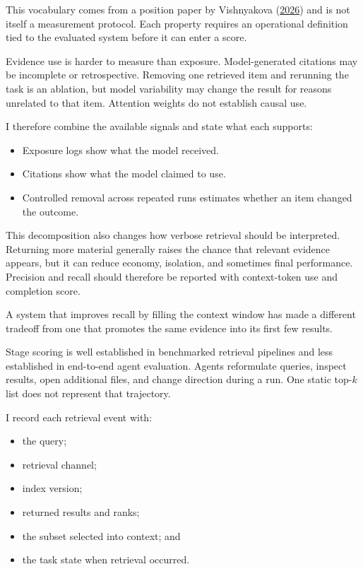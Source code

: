This vocabulary comes from a position paper by Vishnyakova (\href{https://arxiv.org/abs/2603.09619}{2026}) and is not itself a measurement protocol. Each property requires an operational definition tied to the evaluated system before it can enter a score.

Evidence use is harder to measure than exposure. Model-generated citations may be incomplete or retrospective. Removing one retrieved item and rerunning the task is an ablation, but model variability may change the result for reasons unrelated to that item. Attention weights do not establish causal use.


I therefore combine the available signals and state what each supports:

\begin{itemize}
\tightlist
\item
  Exposure logs show what the model received.
\item
  Citations show what the model claimed to use.
\item
  Controlled removal across repeated runs estimates whether an item changed the outcome.
\end{itemize}

This decomposition also changes how verbose retrieval should be interpreted. Returning more material generally raises the chance that relevant evidence appears, but it can reduce economy, isolation, and sometimes final performance. Precision and recall should therefore be reported with context-token use and completion score.

A system that improves recall by filling the context window has made a different tradeoff from one that promotes the same evidence into its first few results.

Stage scoring is well established in benchmarked retrieval pipelines and less established in end-to-end agent evaluation. Agents reformulate queries, inspect results, open additional files, and change direction during a run. One static top-\(k\) list does not represent that trajectory.


I record each retrieval event with:

\begin{itemize}
\tightlist
\item
  the query;
\item
  retrieval channel;
\item
  index version;
\item
  returned results and ranks;
\item
  the subset selected into context; and
\item
  the task state when retrieval occurred.
\end{itemize}

